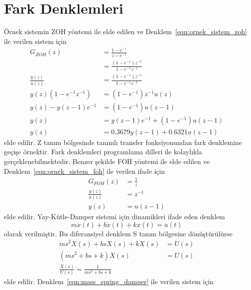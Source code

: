 \chapter{Fark Denklemleri}
Örnek sistemin ZOH yöntemi ile elde edilen ve Denklem~\ref{eqn:ornek_sistem_zoh} ile verilen sistem için
\begin{equation}
\begin{split}
    G_{ZOH}(z)&=\frac{1-e^{-1}}{z-e^{-1}}\\
    &=\frac{(1-e^{-1})z^{-1}}{1-e^{-1}z^{-1}}\\
    \frac{y(z)}{u(z)}&=\frac{(1-e^{-1})z^{-1}}{1-e^{-1}z^{-1}}\\
    y(z)(1-e^{-1}z^{-1})&=(1-e^{-1})z^{-1}u(z)\\
    y(z)-y(z-1)e^{-1}&=(1-e^{-1})u(z-1)\\
    y(z)&=y(z-1)e^{-1}+(1-e^{-1})u(z-1)\\
    y(z)&=0.3679y(z-1)+0.6321u(z-1)
\end{split}
\end{equation}
elde edilir. Z tanım bölgesinde tanımlı transfer fonksiyonundan fark denklemine geçişe örnektir. Fark denklemleri programlama dilleri ile kolaylıkla gerçeklenebilmektedir.
Benzer şekilde FOH yöntemi ile elde edilen ve Denklem~\ref{eqn:ornek_sistem_foh} ile verilen ifade için
\begin{equation}
    \begin{split}
        G_{FOH}(z)&=\frac{1}{z}\\
        \frac{y(z)}{u(z)}&=z^{-1}\\
        y(z)&=u(z-1)
    \end{split}
\end{equation}
elde edilir.
Yay-Kütle-Damper sistemi için dinamikleri ifade eden denklem
\begin{equation}
    m\ddot{x}(t)+b\dot{x}(t)+kx(t)=u(t)\label{eqn:mass_spring_damper}
\end{equation}
olarak verilmiştir. Bu diferansiyel denklem S tanım bölgesine dönüştürülürse
\begin{equation}
\begin{split}
    ms^2X(s)+b sX(s)+kX(s)&=U(s)\\
    (ms^2+b s+k)X(s)&=U(s)\\
    \frac{X(s)}{U(s)}=\frac{1}{ms^2+b s+k}
\end{split}
\end{equation}
elde edilir. Denklem~\ref{eqn:mass_spring_damper} ile verilen sistem için 

